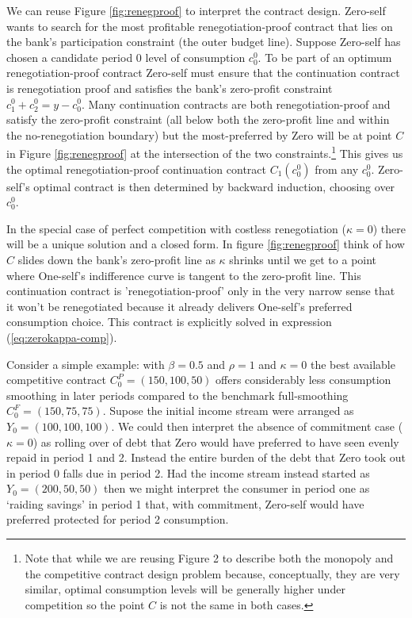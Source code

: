 \documentclass[11pt,english]{article}
\theoremstyle{plain}
\theoremstyle{definition}
\begin{document}
We can reuse Figure \ref{fig:renegproof} to interpret the contract
design. Zero-self wants to search for the most profitable renegotiation-proof
contract that lies on the bank's participation constraint (the outer
budget line). Suppose Zero-self has chosen a candidate period 0 level
of consumption $c_{0}^{0}$. To be part of an optimum renegotiation-proof
contract Zero-self must ensure that the continuation contract is renegotiation
proof and satisfies the bank's zero-profit constraint $c_{1}^{0}+c_{2}^{0}=y-c_{0}^{0}$.
Many continuation contracts are both renegotiation-proof and satisfy
the zero-profit constraint (all below both the zero-profit line and
within the no-renegotiation boundary) but the most-preferred by Zero
will be at point $C$ in Figure \ref{fig:renegproof} at the intersection
of the two constraints.\footnote{Note that while we are reusing Figure 2 to describe both the monopoly
and the competitive contract design problem because, conceptually,
they are very similar, optimal consumption levels will be generally
higher under competition so the point $C$ is not the same in both
cases.} This gives us the optimal renegotiation-proof continuation contract
$C_{1}^ {}(c_{0}^{0})$ from any $c_{0}^{0}$. Zero-self's optimal
contract is then determined by backward induction, choosing over $c_{0}^{0}$.

In the special case of perfect competition with costless renegotiation
($\kappa=0$) there will be a unique solution and a closed form. In
figure \ref{fig:renegproof} think of how $C$ slides down the bank's
zero-profit line as $\kappa$ shrinks until we get to a point where
One-self's indifference curve is tangent to the zero-profit line.
This continuation contract is 'renegotiation-proof' only in the very
narrow sense that it won't be renegotiated because it already delivers
One-self's preferred consumption choice. This contract is explicitly
solved in expression (\ref{eq:zerokappa-comp}).

Consider a simple example: with $\beta=0.5$
and $\rho=1$ and $\kappa=0$ the best available competitive contract
$C_{0}^{P}=(150,100,50)$ offers considerably less consumption smoothing
in later periods compared to the benchmark full-smoothing $C_{0}^{F}=(150,75,75)$.
Supose the initial income stream were arranged as $Y_{0}=(100,100,100).$
We  could then interpret the absence of commitment case ($\kappa=0$) as
rolling over of debt that Zero would have preferred to have
seen evenly repaid in period 1 and 2. Instead the entire burden of the debt that Zero took out in period
0 falls due in period 2. Had the income stream
instead started as $Y_{0}=(200,50,50)$ then we might interpret the consumer
in period one as `raiding savings' in period 1 that, with commitment, Zero-self
would have preferred protected for period 2 consumption.
\end{document}
